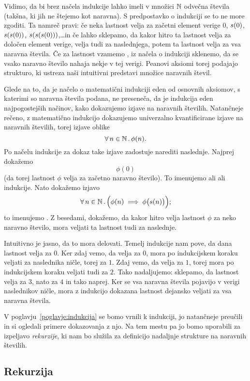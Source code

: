 Vidimo, da bi brez načela indukcije lahko imeli v množici $\mathbb{N}$ odvečna števila (takšna, ki jih ne štejemo kot naravna). S predpostavko o indukciji se to ne more zgoditi. Ta namreč pravi: če neka lastnost velja za začetni element verige $0$, $\suc[0]$, $\suc(\suc[0])$, $\suc(\suc(\suc[0]))$,\ldots in če lahko sklepamo, da kakor hitro ta lastnost velja za določen element verige, velja tudi za naslednjega, potem ta lastnost velja za vsa naravna števila. Če za lastnost vzamemo , iz načela o indukciji sklenemo, da se vsako naravno število nahaja nekje v tej verigi. Peanovi aksiomi torej podajajo strukturo, ki ustreza naši intuitivni predstavi množice naravnih števil.

Glede na to, da je načelo o matematični indukciji eden od osnovnih aksiomov, s katerimi so naravna števila podana, ne preseneča, da je indukcija eden najpogostejših načinov, kako dokazujemo izjave na naravnih številih. Natančneje rečeno, z matematično indukcijo dokazujemo univerzalno kvantificirane izjave na naravnih številih, torej izjave oblike
\[\xall{n}[\NN]{\phi(n)}.\]
Po načelu indukcije za dokaz take izjave zadostuje narediti naslednje. Najprej dokažemo
\[\phi(0)\]
(da torej lastnost $\phi$ velja za začetno naravno število). To imenujemo  ali  ali  indukcije. Nato dokažemo izjavo
\[\all[2]{n}[\NN]{\phi(n) \implies \phi\big(\suc[n]\big)};\]
to imenujemo . Z besedami, dokažemo, da kakor hitro velja lastnost $\phi$ za neko naravno število, mora veljati ta lastnost tudi za naslednje.

Intuitivno je jasno, da to mora delovati. Temelj indukcije nam pove, da dana lastnost velja za $0$. Ker zdaj vemo, da velja za $0$, mora po indukcijskem koraku veljati za naslednika ničle, torej za $1$. Zdaj vemo, da velja za $1$, torej mora po indukcijskem koraku veljati tudi za $2$. Tako nadaljujemo: sklepamo, da lastnost velja za $3$, nato za $4$ in tako naprej. Ker se vsa naravna števila pojavijo v verigi naslednikov ničle, mora z indukcijo dokazana lastnost dejansko veljati za vsa naravna števila.

V poglavju~\ref{poglavje:indukcija} se bomo vrnili k indukciji, jo natančneje preučili in si ogledali primere dokazovanja z njo. Na tem mestu pa jo bomo uporabili za izpeljavo \emph{rekurzije}, ki nam bo služila za definicijo nadaljnje strukture na naravnih številih.

\subsection{Rekurzija}

